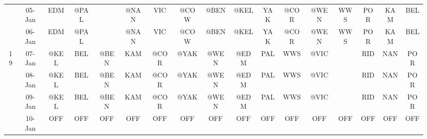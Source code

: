 \begin{table}[htbp]
\begin{tabular}{ccrrrrrrrrrrrrrrr}
          & 05-Jan & \multicolumn{1}{c}{EDM} & \multicolumn{1}{c}{@PAL} &       & \multicolumn{1}{c}{@NAN} & \multicolumn{1}{c}{VIC} & \multicolumn{1}{c}{@COW} & \multicolumn{1}{c}{@BEN} & \multicolumn{1}{c}{@KEL} & \multicolumn{1}{c}{YAK} & \multicolumn{1}{c}{@COR} & \multicolumn{1}{c}{@WEN} & \multicolumn{1}{c}{WWS} & \multicolumn{1}{c}{POR} & \multicolumn{1}{c}{KAM} & \multicolumn{1}{c}{BEL} \\
          & 06-Jan & \multicolumn{1}{c}{EDM} & \multicolumn{1}{c}{@PAL} &       & \multicolumn{1}{c}{@NAN} & \multicolumn{1}{c}{VIC} & \multicolumn{1}{c}{@COW} & \multicolumn{1}{c}{@BEN} & \multicolumn{1}{c}{@KEL} & \multicolumn{1}{c}{YAK} & \multicolumn{1}{c}{@COR} & \multicolumn{1}{c}{@WEN} & \multicolumn{1}{c}{WWS} & \multicolumn{1}{c}{POR} & \multicolumn{1}{c}{KAM} & \multicolumn{1}{c}{BEL} \\
    19    & 07-Jan & \multicolumn{1}{c}{@KEL} & \multicolumn{1}{c}{BEL} & \multicolumn{1}{c}{@BEN} & \multicolumn{1}{c}{KAM} & \multicolumn{1}{c}{@COR} & \multicolumn{1}{c}{@YAK} & \multicolumn{1}{c}{@WEN} & \multicolumn{1}{c}{@EDM} & \multicolumn{1}{c}{PAL} & \multicolumn{1}{c}{WWS} & \multicolumn{1}{c}{@VIC} &       & \multicolumn{1}{c}{RID} & \multicolumn{1}{c}{NAN} & \multicolumn{1}{c}{POR} \\
          & 08-Jan & \multicolumn{1}{c}{@KEL} & \multicolumn{1}{c}{BEL} & \multicolumn{1}{c}{@BEN} & \multicolumn{1}{c}{KAM} & \multicolumn{1}{c}{@COR} & \multicolumn{1}{c}{@YAK} & \multicolumn{1}{c}{@WEN} & \multicolumn{1}{c}{@EDM} & \multicolumn{1}{c}{PAL} & \multicolumn{1}{c}{WWS} & \multicolumn{1}{c}{@VIC} &       & \multicolumn{1}{c}{RID} & \multicolumn{1}{c}{NAN} & \multicolumn{1}{c}{POR} \\
          & 09-Jan & \multicolumn{1}{c}{@KEL} & \multicolumn{1}{c}{BEL} & \multicolumn{1}{c}{@BEN} & \multicolumn{1}{c}{KAM} & \multicolumn{1}{c}{@COR} & \multicolumn{1}{c}{@YAK} & \multicolumn{1}{c}{@WEN} & \multicolumn{1}{c}{@EDM} & \multicolumn{1}{c}{PAL} & \multicolumn{1}{c}{WWS} & \multicolumn{1}{c}{@VIC} &       & \multicolumn{1}{c}{RID} & \multicolumn{1}{c}{NAN} & \multicolumn{1}{c}{POR} \\
          & 10-Jan & \multicolumn{1}{c}{OFF} & \multicolumn{1}{c}{OFF} & \multicolumn{1}{c}{OFF} & \multicolumn{1}{c}{OFF} & \multicolumn{1}{c}{OFF} & \multicolumn{1}{c}{OFF} & \multicolumn{1}{c}{OFF} & \multicolumn{1}{c}{OFF} & \multicolumn{1}{c}{OFF} & \multicolumn{1}{c}{OFF} & \multicolumn{1}{c}{OFF} & \multicolumn{1}{c}{OFF} & \multicolumn{1}{c}{OFF} & \multicolumn{1}{c}{OFF} & \multicolumn{1}{c}{OFF} \\

\end{tabular}
\end{table}
